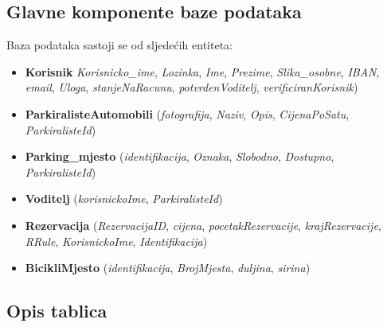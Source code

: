 		
		
		\subsection{Glavne komponente baze podataka}
		Baza podataka sastoji se od sljedećih entiteta:
		
		\begin{itemize}
			\item \textbf{Korisnik} \hspace{0.15cm}\textit{Korisnicko\_ime}, \textit{Lozinka}, \textit{Ime}, \textit{Prezime}, \textit{Slika\_osobne}, \textit{IBAN}, \textit{email}, \textit{Uloga}, \textit{stanjeNaRacunu}, \textit{potvrdenVoditelj}, \textit{verificiranKorisnik})
			
			
			\item \textbf{ParkiralisteAutomobili} (\textit{fotografija}, \textit{Naziv}, \textit{Opis}, \textit{CijenaPoSatu}, \textit{ParkiralisteId}) 
			
			\item \textbf{Parking\_mjesto} (\textit{identifikacija}, \textit{Oznaka}, \textit{Slobodno}, \textit{Dostupno}, \textit{ParkiralisteId})
			
			\item \textbf{Voditelj} (\textit{korisnickoIme}, \textit{ParkiralisteId})
			
			\item \textbf{Rezervacija} (\textit{RezervacijaID}, \textit{cijena}, \textit{pocetakRezervacije}, \textit{krajRezervacije}, \textit{RRule}, \textit{KorisnickoIme}, \textit{Identifikacija})
			
			\item \textbf{BicikliMjesto} (\textit{identifikacija}, \textit{BrojMjesta}, \textit{duljina}, \textit{sirina})
		\end{itemize}
		
		
		
			\subsection{Opis tablica}
			

				
			
